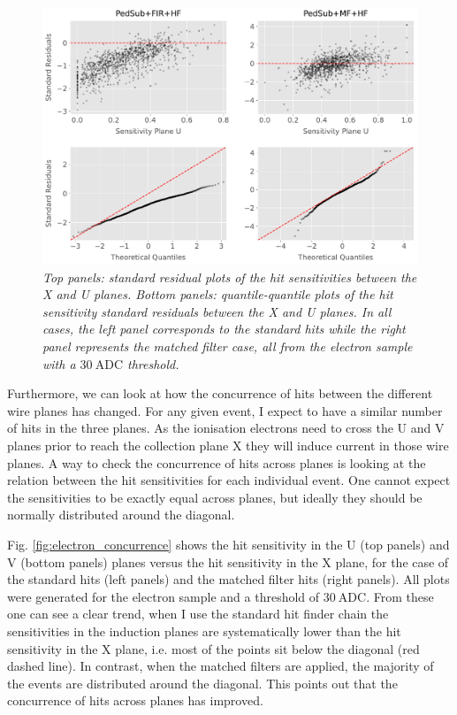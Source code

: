 \begin{figure}[t]
	\centering
	\includegraphics[width=.99\linewidth]{Images/Matched_Filter/hit_study_electron_residuals}
	\caption{\textit{Top panels: standard residual plots of the hit sensitivities between the X and U planes. Bottom panels: quantile-quantile plots of the hit sensitivity standard residuals between the X and U planes. In all cases, the left panel corresponds to the standard hits while the right panel represents the matched filter case, all from the electron sample with a $30 \ \mathrm{ADC}$ threshold.}}
	\label{fig:electron_residuals}
\end{figure}

Furthermore, we can look at how the concurrence of hits between the different wire planes has changed. For any given event, I expect to have a similar number of hits in the three planes. As the ionisation electrons need to cross the U and V planes prior to reach the collection plane X they will induce current in those wire planes. A way to check the concurrence of hits across planes is looking at the relation between the hit sensitivities for each individual event. One cannot expect the sensitivities to be exactly equal across planes, but ideally they should be normally distributed around the diagonal.

Fig. \ref{fig:electron_concurrence} shows the hit sensitivity in the U (top panels) and V (bottom panels) planes versus the hit sensitivity in the X plane, for the case of the standard hits (left panels) and the matched filter hits (right panels). All plots were generated for the electron sample and a threshold of $30 \ \mathrm{ADC}$. From these one can see a clear trend, when I use the standard hit finder chain the sensitivities in the induction planes are systematically lower than the hit sensitivity in the X plane, i.e. most of the points sit below the diagonal (red dashed line). In contrast, when the matched filters are applied, the majority of the events are distributed around the diagonal. This points out that the concurrence of hits across planes has improved.

